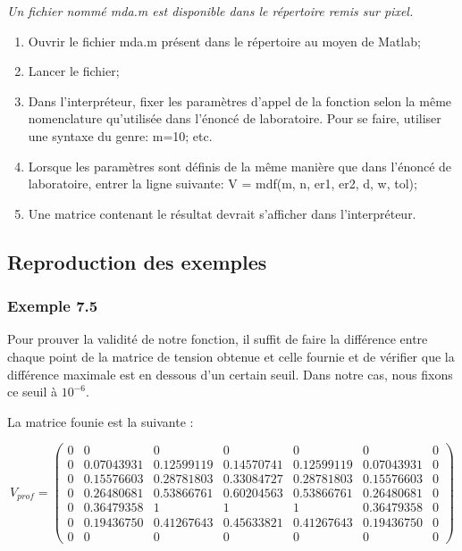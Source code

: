 \textit{Un fichier nommé mda.m est disponible dans le répertoire remis sur pixel.}
\begin{enumerate}
\item Ouvrir le fichier mda.m présent dans le répertoire au moyen de Matlab;
\item Lancer le fichier;
\item Dans l'interpréteur, fixer les paramètres d'appel de la fonction selon la même nomenclature qu'utilisée dans l'énoncé de laboratoire. Pour se faire, utiliser une syntaxe du genre: m=10; etc. 
\item Lorsque les paramètres sont définis de la même manière que dans l'énoncé de laboratoire, entrer la ligne suivante: V  = mdf(m, n, er1, er2, d, w, tol);
\item Une matrice contenant le résultat devrait s'afficher dans l'interpréteur. 
\end{enumerate}

\subsection{Reproduction des exemples}
\subsubsection{Exemple 7.5}
Pour prouver la validité de notre fonction, il suffit de faire la différence entre chaque point de la matrice de tension obtenue et celle fournie et de vérifier que la différence maximale est en dessous d'un certain seuil. Dans notre cas, nous fixons ce seuil à $10^{-6}$.

La matrice founie est la suivante :

\[V_{prof}  = \left(\begin{array}{ccccccc}
0 & 0 			& 0 			& 0 			& 0 			& 0 			& 0 \\
0 & 0.07043931 	& 0.12599119 	& 0.14570741	& 0.12599119	& 0.07043931 	& 0 \\
0 & 0.15576603 	& 0.28781803 	& 0.33084727 	& 0.28781803 	& 0.15576603 	& 0 \\
0 & 0.26480681 	& 0.53866761 	& 0.60204563  	& 0.53866761 	& 0.26480681 	& 0 \\
0 & 0.36479358 	& 1				& 1				& 1			 	& 0.36479358 	& 0 \\
0 & 0.19436750 	& 0.41267643 	& 0.45633821	& 0.41267643 	& 0.19436750 	& 0 \\
0 & 0 			& 0 			& 0 			& 0 			& 0 			& 0 
\end{array} \right)\]

